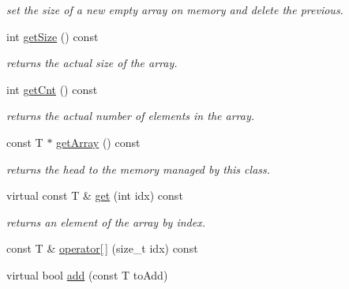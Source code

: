 \begin{DoxyCompactItemize}
\begin{DoxyCompactList}\small\item\em set the size of a new empty array on memory and delete the previous. \end{DoxyCompactList}\item 
\hypertarget{classparray_1_1PointerArray_ac676a9ef1cc04a9aab5f9b744142bf61}{int \hyperlink{classparray_1_1PointerArray_ac676a9ef1cc04a9aab5f9b744142bf61}{get\-Size} () const }\label{classparray_1_1PointerArray_ac676a9ef1cc04a9aab5f9b744142bf61}

\begin{DoxyCompactList}\small\item\em returns the actual size of the array. \end{DoxyCompactList}\item 
\hypertarget{classparray_1_1PointerArray_ac6ad9597cf9fb62857a143e3c241223e}{int \hyperlink{classparray_1_1PointerArray_ac6ad9597cf9fb62857a143e3c241223e}{get\-Cnt} () const }\label{classparray_1_1PointerArray_ac6ad9597cf9fb62857a143e3c241223e}

\begin{DoxyCompactList}\small\item\em returns the actual number of elements in the array. \end{DoxyCompactList}\item 
\hypertarget{classparray_1_1PointerArray_ac2fc7fd12afb0d8fa908ad02a3e39d28}{const T $\ast$ \hyperlink{classparray_1_1PointerArray_ac2fc7fd12afb0d8fa908ad02a3e39d28}{get\-Array} () const }\label{classparray_1_1PointerArray_ac2fc7fd12afb0d8fa908ad02a3e39d28}

\begin{DoxyCompactList}\small\item\em returns the head to the memory managed by this class. \end{DoxyCompactList}\item 
\hypertarget{classparray_1_1PointerArray_a97dbb10226a33da7823685fafe609194}{virtual const T \& \hyperlink{classparray_1_1PointerArray_a97dbb10226a33da7823685fafe609194}{get} (int idx) const }\label{classparray_1_1PointerArray_a97dbb10226a33da7823685fafe609194}

\begin{DoxyCompactList}\small\item\em returns an element of the array by index. \end{DoxyCompactList}\item 
const T \& \hyperlink{classparray_1_1PointerArray_aa009614c6819fe08b7eef78be4394dbc}{operator\mbox{[}$\,$\mbox{]}} (size\-\_\-t idx) const 
\item 
\hypertarget{classparray_1_1PointerArray_ae080aeced3af072006e4a609fdadb838}{virtual bool \hyperlink{classparray_1_1PointerArray_ae080aeced3af072006e4a609fdadb838}{add} (const T to\-Add)}\label{classparray_1_1PointerArray_ae080aeced3af072006e4a609fdadb838}


\end{DoxyCompactItemize}
